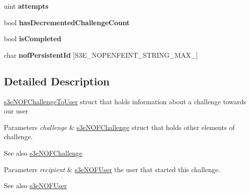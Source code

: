 \begin{DoxyCompactItemize}
\item 
\hypertarget{group___n_open_feint_api_group_gac9ac0743b4a7ac1c637dd8d9a2c17f19}{
uint {\bfseries attempts}}
\label{group___n_open_feint_api_group_gac9ac0743b4a7ac1c637dd8d9a2c17f19}

\item 
\hypertarget{group___n_open_feint_api_group_gaa6c50239f80d43f2680fe34af1593ba0}{
bool {\bfseries hasDecrementedChallengeCount}}
\label{group___n_open_feint_api_group_gaa6c50239f80d43f2680fe34af1593ba0}

\item 
\hypertarget{group___n_open_feint_api_group_ga76d720f4adf95f7561d42f1147fb5c78}{
bool {\bfseries isCompleted}}
\label{group___n_open_feint_api_group_ga76d720f4adf95f7561d42f1147fb5c78}

\item 
\hypertarget{group___n_open_feint_api_group_ga9fe56797f1569770d50ef36dda978508}{
char {\bfseries nofPersistentId} \mbox{[}S3E\_\-NOPENFEINT\_\-STRING\_\-MAX\_\mbox{]}}
\label{group___n_open_feint_api_group_ga9fe56797f1569770d50ef36dda978508}

\end{DoxyCompactItemize}


\subsection{Detailed Description}
\hyperlink{structs3e_n_o_f_challenge_to_user}{s3eNOFChallengeToUser} struct that holds information about a challenge towards our user


\begin{DoxyParams}{Parameters}
{\em challenge} & \hyperlink{structs3e_n_o_f_challenge}{s3eNOFChallenge} struct that holds other elements of challenge. \\
\hline
\end{DoxyParams}
\begin{DoxySeeAlso}{See also}
\hyperlink{structs3e_n_o_f_challenge}{s3eNOFChallenge} 
\end{DoxySeeAlso}

\begin{DoxyParams}{Parameters}
{\em recipient} & \hyperlink{structs3e_n_o_f_user}{s3eNOFUser} the user that started this challenge. \\
\hline
\end{DoxyParams}
\begin{DoxySeeAlso}{See also}
\hyperlink{structs3e_n_o_f_user}{s3eNOFUser} 
\end{DoxySeeAlso}

